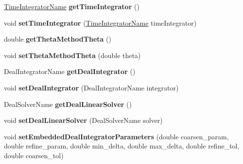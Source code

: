 \begin{DoxyCompactItemize}
\item 
\hypertarget{classnatrium_1_1SolverConfiguration_ac7e6189aaa1b54016993e852999376eb}{
\hyperlink{namespacenatrium_a00a0ec1e80f138680e0fcca78349f6d8}{TimeIntegratorName} {\bfseries getTimeIntegrator} ()}
\label{classnatrium_1_1SolverConfiguration_ac7e6189aaa1b54016993e852999376eb}

\item 
\hypertarget{classnatrium_1_1SolverConfiguration_ac58399f50e64bc8b0efde5b51e246aeb}{
void {\bfseries setTimeIntegrator} (\hyperlink{namespacenatrium_a00a0ec1e80f138680e0fcca78349f6d8}{TimeIntegratorName} timeIntegrator)}
\label{classnatrium_1_1SolverConfiguration_ac58399f50e64bc8b0efde5b51e246aeb}

\item 
\hypertarget{classnatrium_1_1SolverConfiguration_a0e2606b5c10964a08e7107dbe079a1ed}{
double {\bfseries getThetaMethodTheta} ()}
\label{classnatrium_1_1SolverConfiguration_a0e2606b5c10964a08e7107dbe079a1ed}

\item 
\hypertarget{classnatrium_1_1SolverConfiguration_acb2153b276dfc0e28bb2cabf8855acd0}{
void {\bfseries setThetaMethodTheta} (double theta)}
\label{classnatrium_1_1SolverConfiguration_acb2153b276dfc0e28bb2cabf8855acd0}

\item 
\hypertarget{classnatrium_1_1SolverConfiguration_a5ba156b86d81572776d8c20b04f21dcc}{
DealIntegratorName {\bfseries getDealIntegrator} ()}
\label{classnatrium_1_1SolverConfiguration_a5ba156b86d81572776d8c20b04f21dcc}

\item 
\hypertarget{classnatrium_1_1SolverConfiguration_acf54eacaa0135343d69a31f0bbc8031c}{
void {\bfseries setDealIntegrator} (DealIntegratorName integrator)}
\label{classnatrium_1_1SolverConfiguration_acf54eacaa0135343d69a31f0bbc8031c}

\item 
\hypertarget{classnatrium_1_1SolverConfiguration_a0678dd0f89508e37c5c555413d5dc258}{
DealSolverName {\bfseries getDealLinearSolver} ()}
\label{classnatrium_1_1SolverConfiguration_a0678dd0f89508e37c5c555413d5dc258}

\item 
\hypertarget{classnatrium_1_1SolverConfiguration_a63ab4a5ff44381dfff6558c030fa3665}{
void {\bfseries setDealLinearSolver} (DealSolverName solver)}
\label{classnatrium_1_1SolverConfiguration_a63ab4a5ff44381dfff6558c030fa3665}

\item 
\hypertarget{classnatrium_1_1SolverConfiguration_a7a017f7078ef42c350efbfca51d9681c}{
void {\bfseries setEmbeddedDealIntegratorParameters} (double coarsen\_\-param, double refine\_\-param, double min\_\-delta, double max\_\-delta, double refine\_\-tol, double coarsen\_\-tol)}
\label{classnatrium_1_1SolverConfiguration_a7a017f7078ef42c350efbfca51d9681c}


\end{DoxyCompactItemize}
